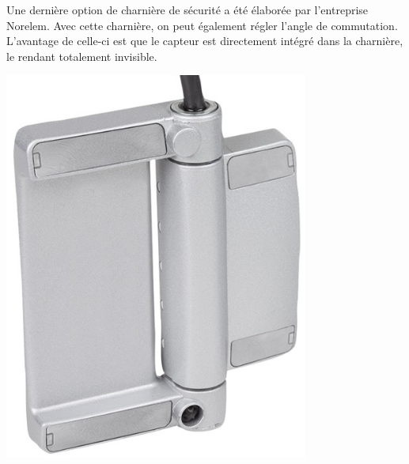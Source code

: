 \begin{minipage}[c]{0.6\textwidth}
    Une dernière option de charnière de sécurité a été élaborée par l'entreprise Norelem. Avec cette charnière, on peut également régler l'angle de commutation. L'avantage de celle-ci est que le capteur est directement intégré dans la charnière, le rendant totalement invisible.

\end{minipage}\hfill
\begin{minipage}[c]{0.35\textwidth}
    \begin{center}
        \includegraphics[width=0.75\textwidth]{assets/figures/Protections_laser/Securite_electrique/charniere_norelem.jpeg}
    \end{center}
    \label{charniere_norelem}
\end{minipage}


